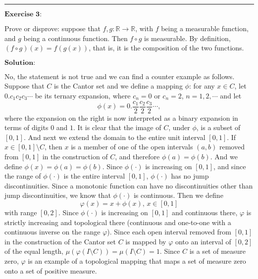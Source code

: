 \documentclass[12pt,a4paper]{ctexart}
\begin{document}
\noindent\rule[0.25\baselineskip]{\textwidth}{0.5pt}

\vspace{8pt}

$\textbf{Exercise 3:}$

Prove or disprove: suppose that $f, g: \mathbb{R} \rightarrow \mathbb{R}$, with $f$ being a measurable function, and $g$ being a continuous function. Then $f \circ g$ is measurable. By definition, $(f \circ g)(x) = f(g(x))$, that is, it is the composition of the two functions.


\vspace{8pt}
$\textbf{Solution:}$

No, the statement is not true and we can find a counter example as follows. Suppose that $C$ is the Cantor set and we define a mapping $\phi$: for any $x \in C$, let $0.c_{1}c_{2}c_{3} \cdots$ be its ternary expansion, where $c_{n} = 0$ or $c_{n} = 2$, $n = 1, 2, \cdots$ and let
\begin{equation*}
    \phi(x) = 0.\frac{c_{1}}{2}\frac{c_{2}}{2}\frac{c_{3}}{2}\cdots,
\end{equation*}
where the expansion on the right is now interpreted as a binary expansion in terms of digits $0$ and $1$. It is clear that the image of $C$, under $\phi$, is a subset of $[0, 1]$. And next we extend the domain to the entire unit interval $[0, 1]$. If $x \in [0, 1] \setminus C $, then $x$ is a member of one of the open intervals $(a, b)$ removed from $[0, 1]$ in the construction of $C$, and therefore $\phi(a) = \phi(b)$. And we define $\phi(x) = \phi(a) = \phi(b)$. Since $\phi(\cdot)$ is increasing on $[0, 1]$, and since the range of $\phi(\cdot)$ is the entire interval $[0, 1]$, $\phi(\cdot)$ has no jump discontinuities. Since a monotonic function can have no discontinuities other than jump discontinuities, we know that $\phi(\cdot)$ is continuous. Then we define
$$\varphi (x) = x + \phi(x), \, x \in [0, 1]$$
with range $[0, 2]$. Since $\phi(\cdot)$ is increasing on $[0, 1]$ and continuous there, $\varphi$ is strictly increasing and topological there (continuous and one-to-one with a continuous inverse on the range $\varphi$). Since each open interval removed from $[0,1]$ in the construction of the Cantor set $C$ is mapped by $\varphi$ onto an interval of $[0, 2]$ of the equal length, $\mu(\varphi(I \setminus C)) = \mu(I \setminus C) = 1$. Since $C$ is a set of measure zero, $\varphi$ is an example of a topological mapping that maps a set of measure zero onto a set of positive measure.
\end{document}
